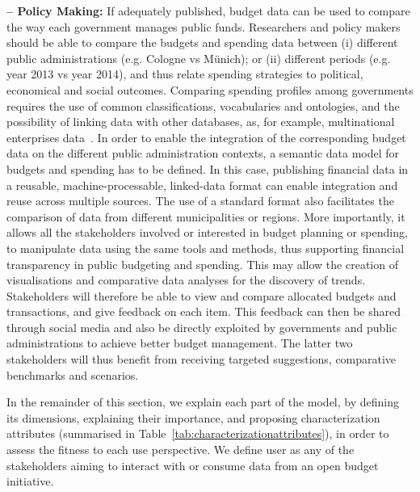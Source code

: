 \vspace{.1cm}

\noindent\textbf{ -- Policy Making:} If adequately published, budget data can be used to compare the way each government manages public funds. 
Researchers and policy makers should be able to compare the budgets and spending data between (i) different public administrations (e.g. Cologne vs Münich); or (ii) different periods (e.g. year 2013 vs year 2014),
 and thus relate spending strategies to political, economical and social outcomes. 
Comparing spending profiles among governments requires the use of common classifications, vocabularies and ontologies, and the possibility of linking data with other databases, as, for example, multinational enterprises data~\cite{Vafopoulos2013}.
In order to enable the integration of the corresponding budget data on the different public administration contexts, a semantic data model for budgets and spending has to be defined.
In this case, publishing financial data in a reusable, machine-processable, linked-data format can enable integration and reuse across multiple sources. 
The use of a standard format also facilitates the comparison of data from different municipalities or regions. 
More importantly, it allows all the stakeholders involved or interested in budget planning or spending, to manipulate data using the same tools and methods, thus supporting financial transparency in public budgeting and spending.
This may allow the creation of visualisations and comparative data analyses for the discovery of trends. 
Stakeholders will therefore be able to view and compare allocated budgets and transactions, and give feedback on each item. 
This feedback can then be shared through social media and also be directly exploited by governments and public administrations to achieve better budget management. 
The latter two stakeholders will thus benefit from receiving targeted suggestions, comparative benchmarks and scenarios.

\vspace{.1cm}

In the remainder of this section, we explain each part of the model, by defining its dimensions, explaining their importance, and proposing characterization attributes (summarised in Table~\ref{tab:characterizationattributes}), in order to assess the fitness to each use perspective.
We define user as any of the stakeholders aiming to interact with or consume data from an open budget initiative.


